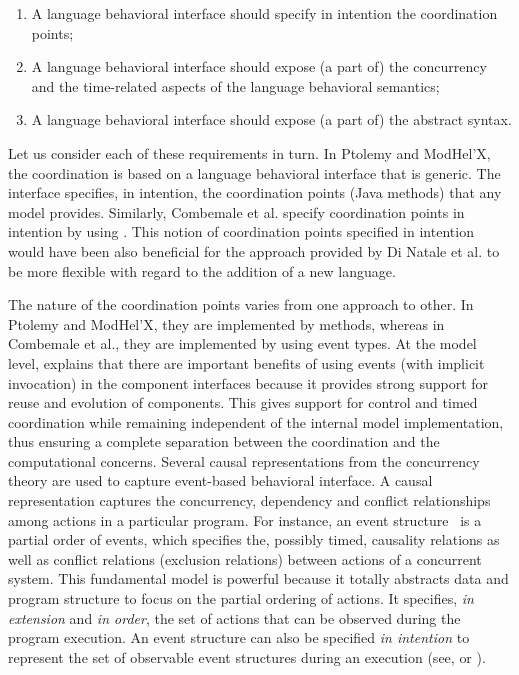 \begin{enumerate}
	\item A language behavioral interface should specify in intention the coordination points;
	\item A language behavioral interface should expose (a part of) the concurrency and the time-related aspects of the language behavioral semantics;
	\item A language behavioral interface should expose (a part of) the abstract syntax.
\end{enumerate}
    
Let us consider each of these requirements in turn. In Ptolemy and ModHel'X, the coordination is based on a language behavioral interface that is generic. The interface specifies, in intention, the coordination points (\ie Java methods) that any model provides. Similarly, Combemale et al. specify coordination points in intention by using \dse. This notion of coordination points specified in intention would have been also beneficial for the approach provided by Di Natale et al. to be more flexible with regard to the addition of a new language.

The nature of the coordination points varies from one approach to other. In Ptolemy and ModHel'X, they are implemented by methods, whereas in Combemale et al., they are implemented by using event types. At the model level, \cite{garlansoftarchbib} explains that there are important benefits of using events (with implicit invocation) in the component interfaces because it provides strong support for reuse and evolution of components. This gives support for control and timed coordination while remaining independent of the internal model implementation, thus ensuring a complete separation between the coordination and the computational concerns. Several causal representations from the concurrency theory are used to capture event-based behavioral interface. A causal representation captures the concurrency, dependency and conflict relationships among actions in a particular program. For instance, an event structure~\cite{eventStructures} is a partial order of events, which specifies the, possibly timed, causality relations as well as conflict relations (\ie exclusion relations) between actions of a concurrent system. This fundamental model is powerful because it totally abstracts data and program structure to focus on the partial ordering of actions. It specifies, \emph{in extension} and \emph{in order}, the set of actions that can be observed during the program execution. An event structure can also be specified \emph{in intention} to represent the set of observable event structures during an execution (see, \eg\cite{ccslbib} or \cite{tagmachinebib}). 

